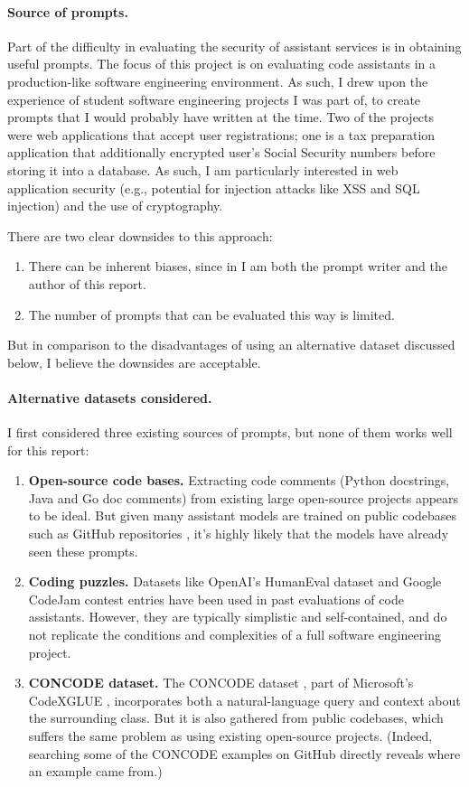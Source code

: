 \documentclass[sigplan,screen,nonacm]{acmart}
\begin{document}
\paragraph{Source of prompts.}
Part of the difficulty in evaluating the security of assistant services is in obtaining useful prompts.
The focus of this project is on evaluating code assistants in a production-like software engineering environment. As such, I drew upon the experience of student software engineering projects I was part of, to create prompts that I would probably have written at the time. Two of the projects were web applications that accept user registrations; one is a tax preparation application that additionally encrypted user's Social Security numbers before storing it into a database. As such, I am particularly interested in web application security (e.g., potential for injection attacks like XSS and SQL injection) and the use of cryptography.

There are two clear downsides to this approach:
\begin{enumerate}
    \item There can be inherent biases, since in I am both the prompt writer and the author of this report.
    \item The number of prompts that can be evaluated this way is limited.
\end{enumerate}
But in comparison to the disadvantages of using an alternative dataset discussed below, I believe the downsides are acceptable.

\paragraph{Alternative datasets considered.}
I first considered three existing sources of prompts, but none of them works well for this report:
\begin{enumerate}
    \item \textbf{Open-source code bases.} Extracting code comments (Python docstrings, Java and Go doc comments) from existing large open-source projects appears to be ideal. But given many assistant models are trained on public codebases such as Git\-Hub repositories \cite{Chen2021EvaluatingLL}, it's highly likely that the models have already seen these prompts.

    \item \textbf{Coding puzzles.} Datasets like Open\-AI's Human\-Eval dataset \cite{openai-humaneval} and Google Code\-Jam contest entries have been used in past evaluations of code assistants. However, they are typically simplistic and self-contained, and do not replicate the conditions and complexities of a full software engineering project.
    
    \item \textbf{CONCODE dataset.} The CONCODE dataset \cite{concode}, part of Microsoft's Code\-XGLUE \cite{ms-codexglue}, incorporates both a natural-language query and context about the surrounding class. But it is also gathered from public codebases, which suffers the same problem as using existing open-source projects. (Indeed, searching some of the CONCODE examples on Git\-Hub directly reveals where an example came from.)
\end{enumerate}
\end{document}
